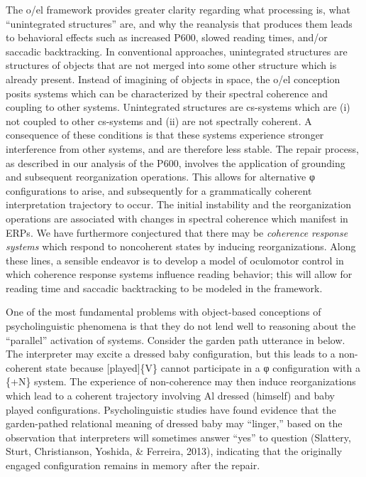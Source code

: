 The o/el framework provides greater clarity regarding what processing is, what “unintegrated structures” are, and why the reanalysis that produces them leads to behavioral effects such as increased P600, slowed reading times, and/or saccadic backtracking. In conventional approaches, unintegrated structures are structures of objects that are not merged into some other structure which is already present. Instead of imagining of objects in space, the o/el conception posits systems which can be characterized by their spectral coherence and coupling to other systems. Unintegrated structures are cs-systems which are (i) not coupled to other cs-systems and (ii) are not spectrally coherent. A consequence of these conditions is that these systems experience stronger interference from other systems, and are therefore less stable. The repair process, as described in our analysis of the P600, involves the application of grounding and subsequent reorganization operations. This allows for alternative φ configurations to arise, and subsequently for a grammatically coherent interpretation trajectory to occur. The initial instability and the reorganization operations are associated with changes in spectral coherence which manifest in ERPs. We have furthermore conjectured that there may be \textit{coherence response systems} which respond to noncoherent states by inducing reorganizations. Along these lines, a sensible endeavor is to develop a model of oculomotor control in which coherence response systems influence reading behavior; this will allow for reading time and saccadic backtracking to be modeled in the framework.

One of the most fundamental problems with object-based conceptions of psycholinguistic phenomena is that they do not lend well to reasoning about the “parallel” activation of systems. Consider the garden path utterance in  below. The interpreter may excite a {\textbar}dressed baby{\textbar} configuration, but this leads to a non-coherent state because [played]\{V\} cannot participate in a φ configuration with a \{+N\} system. The experience of non-coherence may then induce reorganizations which lead to a coherent trajectory involving {\textbar}Al dressed (himself){\textbar} and {\textbar}baby played{\textbar} configurations. Psycholinguistic studies have found evidence that the garden-pathed relational meaning of {\textbar}dressed baby{\textbar} may “linger,” based on the observation that interpreters will sometimes answer “yes” to question  (Slattery, Sturt, Christianson, Yoshida, \& Ferreira, 2013), indicating that the originally engaged configuration remains in memory after the repair.

